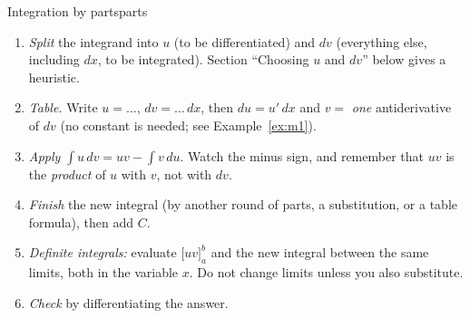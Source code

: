 \documentclass[11pt]{article}
\begin{document}
\begin{proc}{Integration by parts}{parts}
\begin{enumerate}[nosep]
  \item \emph{Split} the integrand into $u$ (to be differentiated) and $dv$ (everything else, including $dx$, to be integrated). Section ``Choosing $u$ and $dv$'' below gives a heuristic.
  \item \emph{Table.} Write $u=\dots$, $dv=\dots\,dx$, then $du=u'\,dx$ and $v=$ \emph{one} antiderivative of $dv$ (no constant is needed; see Example~\ref{ex:m1}).
  \item \emph{Apply} $\int u\,dv=uv-\int v\,du$. Watch the minus sign, and remember that $uv$ is the \emph{product} of $u$ with $v$, not with $dv$.
  \item \emph{Finish} the new integral (by another round of parts, a substitution, or a table formula), then add $C$.
  \item \emph{Definite integrals:} evaluate $\big[uv\big]_a^b$ and the new integral between the same limits, both in the variable $x$. Do not change limits unless you also substitute.
  \item \emph{Check} by differentiating the answer.
\end{enumerate}
\end{proc}
\end{document}
